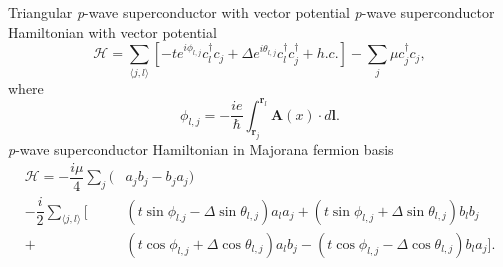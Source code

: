 \documentclass[xcolor=dvipsnames,10pt,aspectratio=169]{beamer}
\let\oldhat\hat
\renewcommand{\hat}[1]{\oldhat{\mathbf{#1}}}
\renewcommand{\vec}[1]{\mathbf{#1}}
\newcommand{\ham}{\mathcal{H}}
\newcommand{\cc}{c^{\dagger}}
\newcommand{\de}{\Delta}
\begin{document}
%
%
%
%

  \begin{frame}{Triangular \textit{p}-wave superconductor with vector potential}
    \textit{p}-wave superconductor Hamiltonian with vector potential
    \begin{equation}
      \ham = \sum_{\langle j,l \rangle} \left[ -t e^{i\phi_{l,j}}\cc_{l} c_j + \de e^{i\theta_{l,j}} \cc_{l}\cc_j + h.c.\right] - \sum_j \mu \cc_j c_j,
    \end{equation}
    where
    \begin{equation}
      \phi_{l,j} = -\dfrac{ie}{\hbar} \int_{\vec{r}_j}^{\vec{r}_l} \vec{A}(x) \cdot d\vec{l}.
    \end{equation}
    \textit{p}-wave superconductor Hamiltonian in Majorana fermion basis
    \begin{align}
      \ham = -\dfrac{i\mu}{4} \sum_j (& a_j b_j - b_j a_j) \nonumber \\
      -\dfrac{i}{2} \sum_{\langle j,l\rangle} [&(t\sin\phi_{l.j}-\de\sin\theta_{l,j}) a_l a_j
      +(t\sin\phi_{l,j}+\de\sin\theta_{l,j}) b_l b_j \nonumber \\
      +&(t\cos\phi_{l,j}+\de\cos\theta_{l,j}) a_l b_j
      -(t\cos\phi_{l,j}-\de\cos\theta_{l,j}) b_l a_j].
    \end{align}

  \end{frame}
\end{document}
